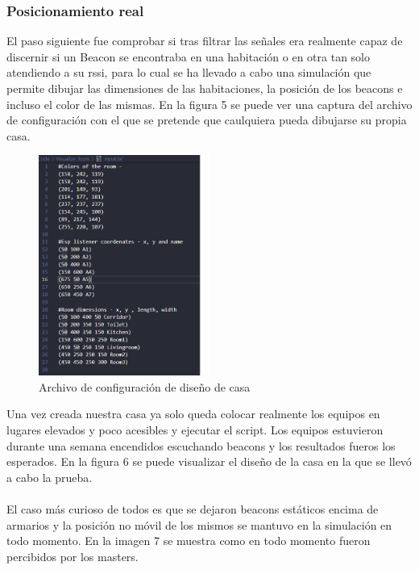 \documentclass[paper=a4, fontsize=11pt,twoside]{scrartcl}
\begin{document}
        \subsubsection{Posicionamiento real}
            El paso siguiente fue comprobar si tras filtrar las señales era realmente capaz de discernir si un Beacon se encontraba en una habitación
            o en otra tan solo atendiendo a su rssi, para lo cual se ha llevado a cabo una simulación que permite dibujar las dimensiones de las 
            habitaciones, la posición de los beacons e incluso el color de las mismas. En la figura 5 se puede ver una captura del archivo de configuración 
            con el que se pretende que caulquiera pueda dibujarse su propia casa.
            \begin{center}
                \begin{figure}[]
                    \centering
                    \includegraphics[width=0.5\textwidth]{../../Memmory/images/config_file_house.PNG}
                    \caption{Archivo de configuración de diseño de casa}
                    \label{fig:mesh16}
                \end{figure}
            \end{center}
            Una vez creada nuestra casa ya solo queda colocar realmente los equipos en lugares elevados y poco acesibles y ejecutar el script.
            Los equipos estuvieron durante una semana encendidos escuchando beacons y los resultados fueros los esperados. En la figura 6 se puede 
            visualizar el diseño de la casa en la que se llevó a cabo la prueba.
            \paragraph{}
            El caso más curioso de todos es que se dejaron beacons estáticos encima de armarios y la posición no móvil de los mismos 
            se mantuvo en la simulación en todo momento. En la imagen 7 se muestra como en todo momento fueron percibidos por los masters.
\end{document}
